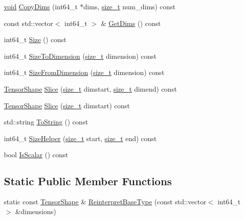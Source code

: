 \begin{DoxyCompactItemize}
\mbox{\hyperlink{mlasi_8h_a88f941d423cb2a819b70a1358982b1a6}{void}} \mbox{\hyperlink{classonnxruntime_1_1TensorShape_a43fc07106b872f36ed139e0a20b94818}{Copy\+Dims}} (int64\+\_\+t $\ast$dims, \mbox{\hyperlink{mlasi_8h_a503efbc1c6e50825320ad909366b78ab}{size\+\_\+t}} num\+\_\+dims) const
\item 
const std\+::vector$<$ int64\+\_\+t $>$ \& \mbox{\hyperlink{classonnxruntime_1_1TensorShape_a37834c200e4b93c78a836db93d9aaa5a}{Get\+Dims}} () const
\item 
int64\+\_\+t \mbox{\hyperlink{classonnxruntime_1_1TensorShape_a01f6e6fbc270702141c4c45573667cd5}{Size}} () const
\item 
int64\+\_\+t \mbox{\hyperlink{classonnxruntime_1_1TensorShape_af322918934d44918346fe19526f52897}{Size\+To\+Dimension}} (\mbox{\hyperlink{mlasi_8h_a503efbc1c6e50825320ad909366b78ab}{size\+\_\+t}} dimension) const
\item 
int64\+\_\+t \mbox{\hyperlink{classonnxruntime_1_1TensorShape_a4a084e4fe8348af11cf8cf1d22c4800d}{Size\+From\+Dimension}} (\mbox{\hyperlink{mlasi_8h_a503efbc1c6e50825320ad909366b78ab}{size\+\_\+t}} dimension) const
\item 
\mbox{\hyperlink{classonnxruntime_1_1TensorShape}{Tensor\+Shape}} \mbox{\hyperlink{classonnxruntime_1_1TensorShape_a996be17420fdb94cd5de15301a50d9be}{Slice}} (\mbox{\hyperlink{mlasi_8h_a503efbc1c6e50825320ad909366b78ab}{size\+\_\+t}} dimstart, \mbox{\hyperlink{mlasi_8h_a503efbc1c6e50825320ad909366b78ab}{size\+\_\+t}} dimend) const
\item 
\mbox{\hyperlink{classonnxruntime_1_1TensorShape}{Tensor\+Shape}} \mbox{\hyperlink{classonnxruntime_1_1TensorShape_aa4a71819ef5121d26e404e2efd022623}{Slice}} (\mbox{\hyperlink{mlasi_8h_a503efbc1c6e50825320ad909366b78ab}{size\+\_\+t}} dimstart) const
\item 
std\+::string \mbox{\hyperlink{classonnxruntime_1_1TensorShape_a3e0292984f1378d4b6c8bf58550da147}{To\+String}} () const
\item 
int64\+\_\+t \mbox{\hyperlink{classonnxruntime_1_1TensorShape_a85c717aa5d4607765c55a461a5b6f754}{Size\+Helper}} (\mbox{\hyperlink{mlasi_8h_a503efbc1c6e50825320ad909366b78ab}{size\+\_\+t}} start, \mbox{\hyperlink{mlasi_8h_a503efbc1c6e50825320ad909366b78ab}{size\+\_\+t}} end) const
\item 
bool \mbox{\hyperlink{classonnxruntime_1_1TensorShape_a5c57c44b3f248614e3066a70e5d1a701}{Is\+Scalar}} () const
\end{DoxyCompactItemize}
\subsection*{Static Public Member Functions}
\begin{DoxyCompactItemize}
\item 
static const \mbox{\hyperlink{classonnxruntime_1_1TensorShape}{Tensor\+Shape}} \& \mbox{\hyperlink{classonnxruntime_1_1TensorShape_ac7df37b3db58eb9e1847986b89fd2c6f}{Reinterpret\+Base\+Type}} (const std\+::vector$<$ int64\+\_\+t $>$ \&dimensions)
\end{DoxyCompactItemize}


